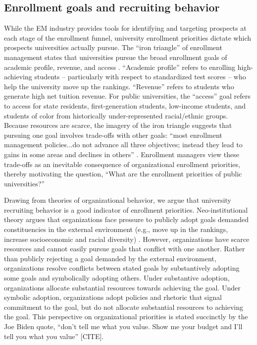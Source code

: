 \documentclass[twoside]{article}
\begin{document}
\subsection*{Enrollment goals and recruiting behavior}

While the EM industry provides tools for identifying and targeting prospects at each stage of the enrollment funnel, university enrollment priorities dictate which prospects universities actually pursue.  The ``iron triangle'' of enrollment management states that universities pursue the broad enrollment goals of academic profile, revenue, and access \citep{RN2772}. ``Academic profile'' refers to enrolling high-achieving students -- particularly with respect to standardized test scores -- who help the university move up the rankings. ``Revenue'' refers to students who generate high net tuition revenue.  For public universities, the ``access'' goal refers to access for state residents, first-generation students, low-income students, and students of color from historically under-represented racial/ethnic groups. Because resources are scarce, the imagery of the iron triangle suggests that pursuing one goal involves trade-offs with other goals: ``most enrollment management policies...do not advance all three objectives; instead they lead to gains in some areas and declines in others'' \citep[p.~221]{RN2772}. Enrollment managers view these trade-offs as an inevitable consequence of organizational enrollment priorities, thereby motivating the question, ``What are the enrollment priorities of public universities?''

Drawing from theories of organizational behavior, we argue that university recruiting behavior is a good indicator of enrollment priorities.  Neo-institutional theory argues that organizations face pressure to publicly adopt goals demanded constituencies in the external environment (e.g., move up in the rankings, increase socioeconomic and racial diversity) \citep{RN513,RN527}. However, organizations have scarce resources and cannot easily pursue goals that conflict with one another.  Rather than publicly rejecting a goal demanded by the external environment, organizations resolve conflicts between stated goals by substantively adopting some goals and symbolically adopting others.  Under substantive adoption, organizations allocate substantial resources towards achieving the goal.  Under symbolic adoption, organizations adopt policies and rhetoric that signal commitment to the goal, but do not allocate substantial resources to achieving the goal.  This perspective on organizational priorities is stated succinctly by the Joe Biden quote, ``don’t tell me what you value. Show me your budget and I’ll tell you what you value'' [CITE].
\end{document}
